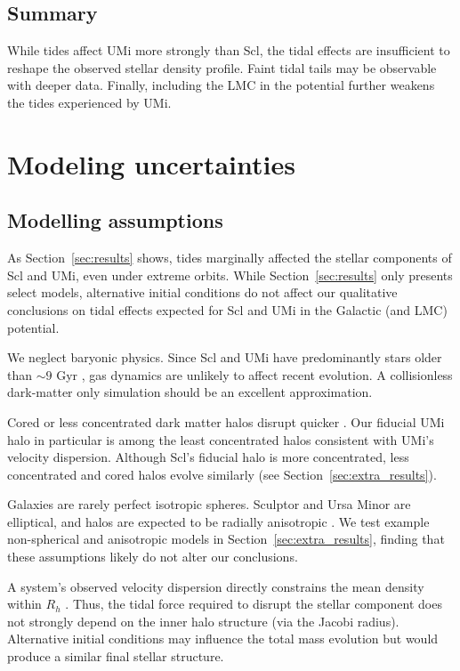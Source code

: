 \subsection{Summary}\label{summary-1}

While tides affect UMi more strongly than Scl, the tidal effects are
insufficient to reshape the observed stellar density profile. Faint
tidal tails may be observable with deeper data. Finally, including the
LMC in the potential further weakens the tides experienced by UMi.

\section{Modeling uncertainties}\label{modeling-uncertainties}

\subsection{Modelling assumptions}\label{modelling-assumptions}

As Section~\ref{sec:results} shows, tides marginally affected the
stellar components of Scl and UMi, even under extreme orbits. While
Section~\ref{sec:results} only presents select models, alternative
initial conditions do not affect our qualitative conclusions on tidal
effects expected for Scl and UMi in the Galactic (and LMC) potential.

We neglect baryonic physics. Since Scl and UMi have predominantly stars
older than \(\sim 9\) Gyr
\citep{carrera+2002, deboer+2011, weisz+2014, delosreyes+2022, sato+2025},
gas dynamics are unlikely to affect recent evolution. A collisionless
dark-matter only simulation should be an excellent approximation.

Cored or less concentrated dark matter halos disrupt quicker
\citep[e.g.,][]{stucker+2023}. Our fiducial UMi halo in particular is
among the least concentrated halos consistent with UMi's velocity
dispersion. Although Scl's fiducial halo is more concentrated, less
concentrated and cored halos evolve similarly (see
Section~\ref{sec:extra_results}).

Galaxies are rarely perfect isotropic spheres. Sculptor and Ursa Minor
are elliptical, and halos are expected to be radially anisotropic
\citep[e.g.,][]{navarro+2010}. We test example non-spherical and
anisotropic models in Section~\ref{sec:extra_results}, finding that
these assumptions likely do not alter our conclusions.

A system's observed velocity dispersion directly constrains the mean
density within \(R_h\) \citep[e.g.,][]{wolf+2010}. Thus, the tidal force
required to disrupt the stellar component does not strongly depend on
the inner halo structure (via the Jacobi radius). Alternative initial
conditions may influence the total mass evolution but would produce a
similar final stellar structure.

